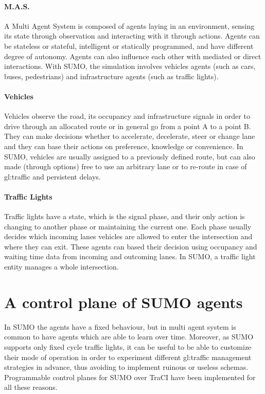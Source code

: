 \paragraph{M.A.S.}

A Multi Agent System is composed of agents laying in an environment, sensing its state through observation and interacting with it through actions. Agents can be stateless or stateful, intelligent or statically programmed, and have different degree of autonomy. Agents can also influence each other with mediated or direct interactions. With SUMO, the simulation involves vehicles agents (such as cars, buses, pedestrians) and infrastructure agents (such as traffic lights).

\paragraph{Vehicles}

Vehicles observe the road, its occupancy and infrastructure signals in order to drive through an allocated route or in general go from a point A to a point B. They can make decisions whether to accelerate, decelerate, steer or change lane and they can base their actions on preference, knowledge or convenience. In SUMO, vehicles are usually assigned to a previously defined route, but can also made (through options) free to use an arbitrary lane or to re-route in case of \gls{gl:traffic} and persistent delays.

\paragraph{Traffic Lights}

Traffic lights have a state, which is the signal phase, and their only action is changing to another phase or maintaining the current one. Each phase usually decides which incoming lanes vehicles are allowed to enter the intersection and where they can exit. These agents can based their decision using occupancy and waiting time data from incoming and outcoming lanes. In SUMO, a traffic light entity manages a whole intersection.

\section{A control plane of SUMO agents}

In SUMO the agents have a fixed behaviour, but in multi agent system is common to have agents which are able to learn over time. Moreover, as SUMO supports only fixed cycle traffic lights, it can be useful to be able to customize their mode of operation in order to experiment different \gls{gl:traffic} management strategies in advance, thus avoiding to implement ruinous or useless schemas. Programmable control planes for SUMO over TraCI have been implemented for all these reasons.

